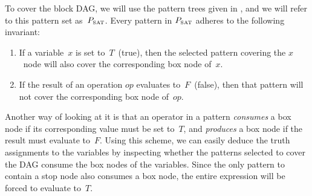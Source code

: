 %
%        
%
%        
%
%
%      
%
%

\def\mPSat{P_\text{\smaller SAT}}%

To cover the \gls{block DAG}, we will use the \glspl{pattern tree} given in
, and we will refer to this \gls{pattern set}
as~$\mPSat$.
%
 Every \gls{pattern} in $\mPSat$ adheres to the following
invariant:
\begin{enumerate}
  \item If a variable~$x$ is set to~$T$~(true), then the selected
    \gls{pattern} covering the $x$~\gls{node} will also cover the corresponding
    \gls{box node} of~$x$.
  \item If the result of an operation $\mathit{op}$ evaluates to~$F$~(false),
    then that \gls{pattern} will not cover the corresponding \gls{box node}
    of~$\mathit{op}$.
\end{enumerate}
Another way of looking at it is that an operator in a \gls{pattern}
\emph{consumes} a \gls{box node} if its corresponding value must be set to~$T$,
and \emph{produces} a \gls{box node} if the result must evaluate to~$F$.
%
Using
this scheme, we can easily deduce the truth assignments to the variables by
inspecting whether the \glspl{pattern} selected to cover the \gls{DAG} consume
the \glspl{box node} of the variables.
%
Since the only \gls{pattern} to contain a
\gls{stop node} also consumes a \gls{box node}, the entire expression will be
forced to evaluate to~$T$.

